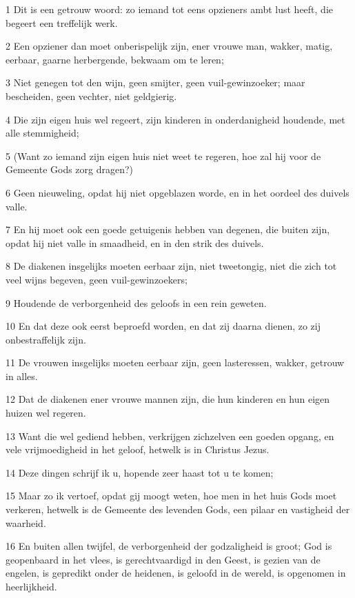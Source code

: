 \par 1 Dit is een getrouw woord: zo iemand tot eens opzieners ambt lust heeft, die begeert een treffelijk werk.
\par 2 Een opziener dan moet onberispelijk zijn, ener vrouwe man, wakker, matig, eerbaar, gaarne herbergende, bekwaam om te leren;
\par 3 Niet genegen tot den wijn, geen smijter, geen vuil-gewinzoeker; maar bescheiden, geen vechter, niet geldgierig.
\par 4 Die zijn eigen huis wel regeert, zijn kinderen in onderdanigheid houdende, met alle stemmigheid;
\par 5 (Want zo iemand zijn eigen huis niet weet te regeren, hoe zal hij voor de Gemeente Gods zorg dragen?)
\par 6 Geen nieuweling, opdat hij niet opgeblazen worde, en in het oordeel des duivels valle.
\par 7 En hij moet ook een goede getuigenis hebben van degenen, die buiten zijn, opdat hij niet valle in smaadheid, en in den strik des duivels.
\par 8 De diakenen insgelijks moeten eerbaar zijn, niet tweetongig, niet die zich tot veel wijns begeven, geen vuil-gewinzoekers;
\par 9 Houdende de verborgenheid des geloofs in een rein geweten.
\par 10 En dat deze ook eerst beproefd worden, en dat zij daarna dienen, zo zij onbestraffelijk zijn.
\par 11 De vrouwen insgelijks moeten eerbaar zijn, geen lasteressen, wakker, getrouw in alles.
\par 12 Dat de diakenen ener vrouwe mannen zijn, die hun kinderen en hun eigen huizen wel regeren.
\par 13 Want die wel gediend hebben, verkrijgen zichzelven een goeden opgang, en vele vrijmoedigheid in het geloof, hetwelk is in Christus Jezus.
\par 14 Deze dingen schrijf ik u, hopende zeer haast tot u te komen;
\par 15 Maar zo ik vertoef, opdat gij moogt weten, hoe men in het huis Gods moet verkeren, hetwelk is de Gemeente des levenden Gods, een pilaar en vastigheid der waarheid.
\par 16 En buiten allen twijfel, de verborgenheid der godzaligheid is groot; God is geopenbaard in het vlees, is gerechtvaardigd in den Geest, is gezien van de engelen, is gepredikt onder de heidenen, is geloofd in de wereld, is opgenomen in heerlijkheid.


